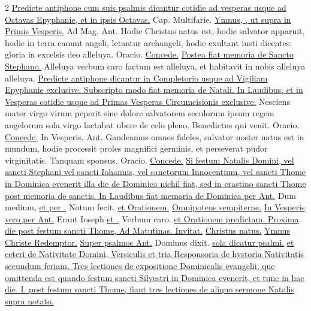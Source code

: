 \begin{multicols*}{2}
\newline \ul{Predicte antiphone cum suis psalmis dicantur cotidie ad vesperas usque ad Octavas Epyphanie, et in ipsis Octavas.} {\color{Red} Cap.} Multifarie. \ul{Ymnus, \Vbar , ut supra in Primis Vesperis.} {\color{Red} Ad Mag. Ant.} Hodie Christus natus est, hodie salvator apparuit, hodie in terra canunt angeli, letantur archangeli, hodie exultant iusti dicentes: gloria in excelsis deo alleluya. {\color{Red} Oracio.} \hyperlink{concede-nativitas}{Concede.} \ul{Postea fiat memoria de Sancto Stephano.}
 Alleluya verbum caro factum est alleluya, et habitavit in nobis alleluya alleluya.
\newline \ul{Predicte antiphone dicantur in Completorio usque ad Vigiliam Epyphanie exclusive. Subscripto modo fiat memoria de Natali. In Laudibus, et in Vesperas cotidie usque ad Primas Vesperas Circumcisionis exclusive.}
 Nesciens mater virgo virum peperit sine dolore salvatorem seculorum ipsum regem angelorum sola virgo lactabat ubere de celo pleno. \V Benedictus qui venit. {\color{Red} Oracio.} \hyperlink{concede-nativitas}{Concede.} {\color{Red} In Vesperis. Ant.} Gaudeamus omnes fideles, salvator noster natus est in mundum, hodie processit proles magnifici germinis, et perseverat pudor virginitatis. \V Tanquam sponsus. {\color{Red} Oracio.} \hyperlink{concede-nativitas}{Concede.}
\newline \ul{Si festum Natalis Domini, vel sancti Stephani vel sancti Iohannis, vel sanctorum Innocentium, vel sancti Thome in Dominica evenerit illa die de Dominica nichil fiat, sed in crastino sancti Thome post memoria de sanctis. In Laudibus fiat memoria de Dominica per Ant.} Dum medium, \ul{et per \Vbar .} Notum fecit. \ul{et Orationem.} \hyperlink{omnipotens-nativitas}{Omnipotens sempiterne.} \ul{In Vesperis vero per Ant.} Erant Ioseph \ul{et \Vbar .} Verbum caro. \ul{et Orationem predictam. Proxima die post festum sancti Thome, Ad Matutinas. Invitat.} \hyperlink{christus-natus-invitatorium}{Christus natus.} \ul{Ymnus} \hyperlink{christe-redemptor}{Christe Redemptor.} \ul{Super psalmos Ant.} Dominus dixit. \ul{sola dicatur psalmi.}  \ul{et ceteri de Nativitate Domini, Versiculis et tria Responsoria de hystoria Nativitatis secundum feriam. Tres lectiones de expositione Dominicalis evangelii, que omittenda est quando festum sancti Silvestri in Dominica evenerit, et tunc in hac die. I. post festum sancti Thome, fiant tres lectiones de aliquo sermone Natalis supra notato.}

\end{multicols*}
